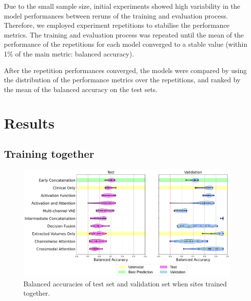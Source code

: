 Due to the small sample size, initial experiments showed high variability in the model performances between reruns of the training and evaluation process.
Therefore, we employed experiment repetitions to stabilise the performance metrics.
The training and evaluation process was repeated until the mean of the performance of the repetitions for each model converged to a stable value (within 1\% of the main metric: balanced accuracy).

After the repetition performances converged, the models were compared by using the distribution of the performance metrics over the repetitions, and ranked by the mean of the balanced accuracy on the test sets.


\section{Results}
\subsection{Training together}

\begin{figure}
    \centering
    \hspace*{-2cm}
    \includegraphics[width=1.2\linewidth]{figures/both_sites_together_balanced_accuracy_violin}
    \caption{Balanced accuracies of test set and validation set when sites trained together.}
    \label{fig:trainedtogetherviolin}
\end{figure}

